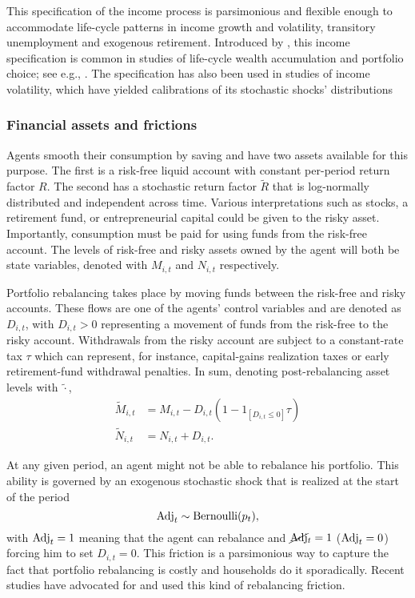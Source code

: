 \documentclass[./RiskyContrib.tex]{subfiles}
\begin{document}
This specification of the income process is parsimonious and flexible enough to accommodate
life-cycle patterns in income growth and volatility, transitory unemployment and exogenous
retirement. Introduced by \cite{Carroll1997qje}, this income specification is common in studies
of life-cycle wealth accumulation and portfolio choice; see e.g.,
\cite{Cagetti2003jbes,Cocco2005rfs,Fagereng2017jof}. The specification has
also been used in studies of income volatility, which have yielded calibrations of its stochastic
shocks' distributions \citep[see e.g.,][]{Carroll1992bpea,Carroll1997jme,Sabelhaus2010jme}

\subsubsection{Financial assets and frictions}\label{sec:fin_frictions}

Agents smooth their consumption by saving and have two assets
available for this purpose. The first is a risk-free liquid account with 
constant per-period return factor $R$. The second has a stochastic return
factor $\tilde{R}$ that is log-normally distributed and independent across
time. Various interpretations such as stocks, a retirement fund, or entrepreneurial
capital could be given to the risky asset. Importantly, consumption must be paid for
using funds from the risk-free account. The levels of risk-free and risky assets
owned by the agent will both be state variables, denoted with $M_{i,t}$ and $N_{i,t}$
respectively.

Portfolio rebalancing takes place by moving funds between the risk-free
and risky accounts. These flows are one of the agents' control variables
and are denoted as $D_{i,t}$, with $D_{i,t}>0$ representing a movement of
funds from the risk-free to the risky account. Withdrawals from the risky
account are subject to a constant-rate tax $\tau$ which can represent, for
instance, capital-gains realization taxes or early retirement-fund withdrawal
penalties. In sum, denoting post-rebalancing asset levels with $\tilde{\cdot}$,
\begin{equation*}
\begin{split}
\tilde{M}_{i,t} &= M_{i,t} - D_{i,t}(1 - 1_{[D_{i,t}\leq0]}\tau)\\
\tilde{N}_{i,t} &= N_{i,t} + D_{i,t}.
\end{split}
\end{equation*}

At any given period, an agent might not be able to rebalance his portfolio.
This ability is governed by an exogenous stochastic shock that is realized
at the start of the period
\begin{equation*}
\text{Adj}_t \sim \text{Bernoulli}(p_t),
\end{equation*}
with $\text{Adj}_t=1$ meaning that the agent can rebalance and $\cancel{\text{Adj}}_t=1$ ($\text{Adj}_t = 0$)
forcing him to set $D_{i,t} = 0$. This friction is a parsimonious way to capture
the fact that portfolio rebalancing is costly and households do it sporadically.
Recent studies have advocated for \citep{Giglio2021aer} and used
\citep{Luetticke2021aej_macro} this kind of rebalancing friction.
\end{document}
